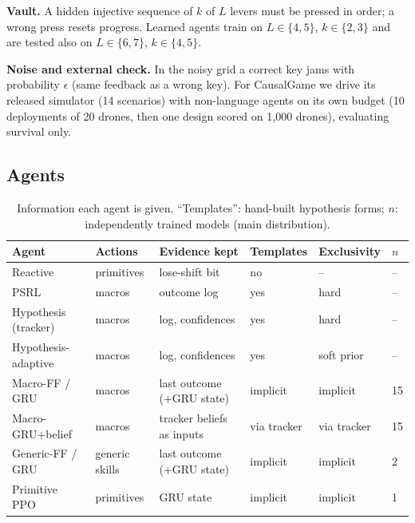 \documentclass[conference]{IEEEtran}
\begin{document}
\textbf{Vault.} A hidden injective sequence of $k$ of $L$ levers must be pressed in order; a wrong press resets progress. Learned agents train on $L\in\{4,5\}$, $k\in\{2,3\}$ and are tested also on $L\in\{6,7\}$, $k\in\{4,5\}$.

\textbf{Noise and external check.} In the noisy grid a correct key jams with probability $\epsilon$ (same feedback as a wrong key). For CausalGame we drive its released simulator (14 scenarios) with non-language agents on its own budget (10 deployments of 20 drones, then one design scored on 1{,}000 drones), evaluating survival only.

\subsection{Agents}
\begin{table}[!t]
\caption{Information each agent is given. ``Templates'': hand-built hypothesis forms; $n$: independently trained models (main distribution).}\label{tab:info}
\centering\footnotesize
\begin{tabular}{llllll}
\toprule
Agent & Actions & Evidence kept & Templates & Exclusivity & $n$ \\
\midrule
Reactive & primitives & lose-shift bit & no & -- & -- \\
PSRL & macros & outcome log & yes & hard & -- \\
Hypothesis (tracker) & macros & log, confidences & yes & hard & -- \\
Hypothesis-adaptive & macros & log, confidences & yes & soft prior & -- \\
Macro-FF / GRU & macros & last outcome (+GRU state) & implicit & implicit & 15 \\
Macro-GRU+belief & macros & tracker beliefs as inputs & via tracker & via tracker & 15 \\
Generic-FF / GRU & generic skills & last outcome (+GRU state) & implicit & implicit & 2 \\
Primitive PPO & primitives & GRU state & implicit & implicit & 1 \\
\bottomrule
\end{tabular}
\end{table}
\end{document}
